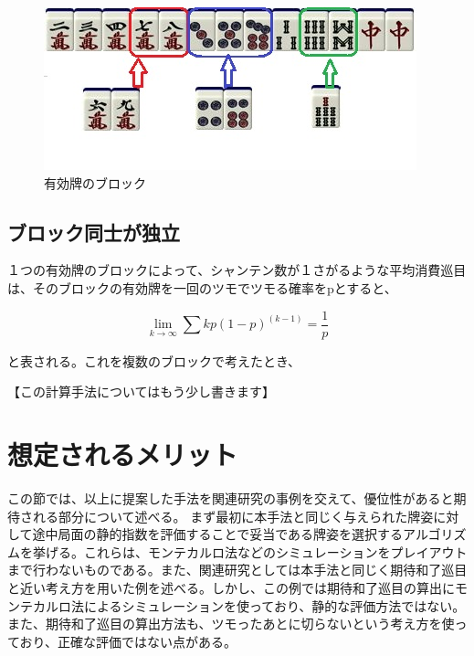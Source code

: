 \begin{figure}[h]
 \centering
 \includegraphics[keepaspectratio, scale=1,bb=0 0 320 194]
      {img/block.jpg}
 \caption{有効牌のブロック}
 \label{block}
\end{figure}

\subsection{ブロック同士が独立}
１つの有効牌のブロックによって、シャンテン数が１さがるような平均消費巡目は、そのブロックの有効牌を一回のツモでツモる確率をpとすると、

\begin{equation}
\label{kitai1}
\lim _{k\rightarrow \infty }\sum { kp(1-p)^(k-1)} = \displaystyle \frac{1}{p}
\end{equation}

と表される。これを複数のブロックで考えたとき、

【この計算手法についてはもう少し書きます】









\section{想定されるメリット}
この節では、以上に提案した手法を関連研究の事例を交えて、優位性があると期待される部分について述べる。
まず最初に本手法と同じく与えられた牌姿に対して途中局面の静的指数を評価することで妥当である牌姿を選択するアルゴリズムを挙げる。これらは、モンテカルロ法などのシミュレーションをプレイアウトまで行わないものである。また、関連研究としては本手法と同じく期待和了巡目と近い考え方を用いた例を述べる。しかし、この例では期待和了巡目の算出にモンテカルロ法によるシミュレーションを使っており、静的な評価方法ではない。また、期待和了巡目の算出方法も、ツモったあとに切らないという考え方を使っており、正確な評価ではない点がある。


